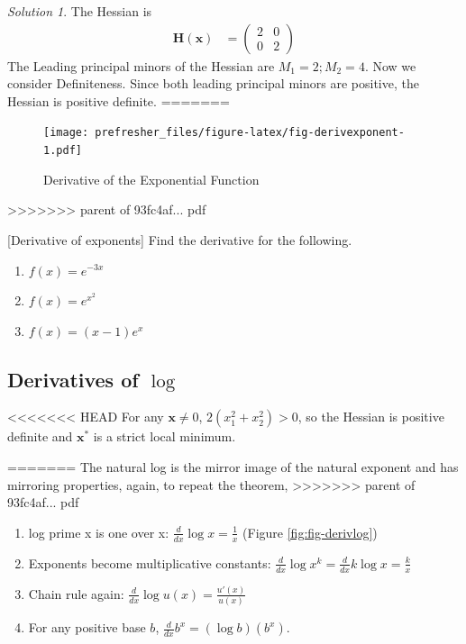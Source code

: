 \documentclass[]{book}
\providecommand{\tightlist}{%
  \setlength{\itemsep}{0pt}\setlength{\parskip}{0pt}}
\theoremstyle{definition}
\theoremstyle{definition}
\theoremstyle{definition}
\theoremstyle{remark}
\newtheorem*{solution}{Solution}
\begin{document}
\begin{solution}
{}
The Hessian is
\begin{align*}
\mathbf{H(x)} &= \begin{pmatrix} 2&0\\0&2 \end{pmatrix}
\end{align*}
The Leading principal minors of the Hessian are \(M_1=2; M_2=4\). Now we consider Definiteness. Since both leading principal minors are positive, the Hessian is positive definite.
=======
\begin{figure}
\centering
\texttt{[image: prefresher\_files/figure-latex/fig-derivexponent-1.pdf]}
\caption{\label{fig:fig-derivexponent}Derivative of the Exponential Function}
\end{figure}
>>>>>>> parent of 93fc4af... pdf

[Derivative of exponents]
\protect\hypertarget{exm:exmderivexp}{}{\label{exm:exmderivexp} {} }Find the derivative for the following.

\begin{enumerate}
\def\labelenumi{\arabic{enumi}.}
\tightlist
\item
  \(f(x)=e^{-3x}\)
\item
  \(f(x)=e^{x^2}\)
\item
  \(f(x)=(x-1)e^x\)
\end{enumerate}

\hypertarget{derivatives-of-log}{%
\subsection*{\texorpdfstring{Derivatives of \(\log\)}{Derivatives of \textbackslash{}log}}\label{derivatives-of-log}}

<<<<<<< HEAD
For any \(\mathbf{x}\ne 0\), \(2(x_1^2+x_2^2)>0\), so the Hessian is positive definite and \(\mathbf{x}^*\) is a strict local minimum.
\end{solution}
=======
The natural log is the mirror image of the natural exponent and has mirroring properties, again, to repeat the theorem,
>>>>>>> parent of 93fc4af... pdf

\begin{enumerate}
\def\labelenumi{\arabic{enumi}.}
\tightlist
\item
  log prime x is one over x: \(\frac{d}{dx} \log x = \frac{1}{x}\) (Figure \ref{fig:fig-derivlog})
\item
  Exponents become multiplicative constants: \(\frac{d}{dx} \log x^k = \frac{d}{dx} k \log x = \frac{k}{x}\)
\item
  Chain rule again: \(\frac{d}{dx} \log u(x) = \frac{u'(x)}{u(x)}\quad\)
\item
  For any positive base \(b\), \(\frac{d}{dx} b^x = (\log b)\left(b^x\right)\).
\end{enumerate}
\end{document}
